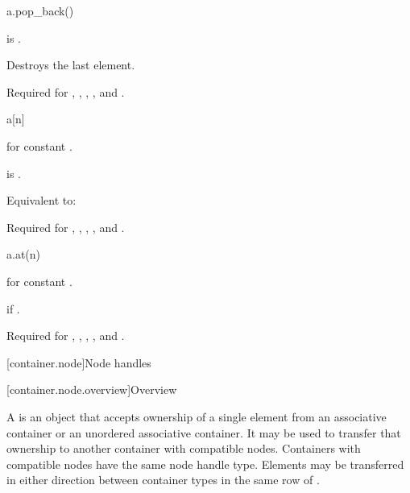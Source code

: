 \begin{itemdecl}
a.pop_back()
\end{itemdecl}

\begin{itemdescr}
\pnum
\result
{}

\pnum
\hardexpects
{} is .

\pnum
\effects
Destroys the last element.

\pnum
\remarks
Required for
,
,
,
, and
.
\end{itemdescr}

\begin{itemdecl}
a[n]
\end{itemdecl}

\begin{itemdescr}
\pnum
\result
{} for constant .

\pnum
\hardexpects
{} is .

\pnum
\effects
Equivalent to: 

\pnum
\remarks
Required for
,
,
,
, and
.
\end{itemdescr}

\begin{itemdecl}
a.at(n)
\end{itemdecl}

\begin{itemdescr}
\pnum
\result
{} for constant .

\pnum
\returns
{}

\pnum
\throws
{} if .

\pnum
\remarks
Required for
,
,
,
, and
.
\end{itemdescr}

[container.node]{Node handles}

[container.node.overview]{Overview}

\pnum
A  is an object that accepts ownership of a single element
from an associative container or an unordered
associative container. It may be used to transfer that
ownership to another container with compatible nodes.  Containers with
compatible nodes have the same node handle type. Elements may be transferred in
either direction between container types in the same row of
.

